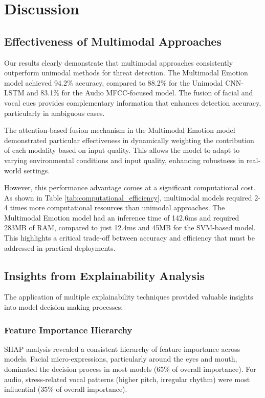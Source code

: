 \documentclass[conference,compsoc]{IEEEtran}
\begin{document}
\section{Discussion}
\nopagebreak[4]
\subsection{Effectiveness of Multimodal Approaches}
\nopagebreak[4]
Our results clearly demonstrate that multimodal approaches consistently outperform unimodal methods for threat detection. The Multimodal Emotion model achieved 94.2\% accuracy, compared to 88.2\% for the Unimodal CNN-LSTM and 83.1\% for the Audio MFCC-focused model. The fusion of facial and vocal cues provides complementary information that enhances detection accuracy, particularly in ambiguous cases.

The attention-based fusion mechanism in the Multimodal Emotion model demonstrated particular effectiveness in dynamically weighting the contribution of each modality based on input quality. This allows the model to adapt to varying environmental conditions and input quality, enhancing robustness in real-world settings.

However, this performance advantage comes at a significant computational cost. As shown in Table \ref{tab:computational_efficiency}, multimodal models required 2-4 times more computational resources than unimodal approaches. The Multimodal Emotion model had an inference time of 142.6ms and required 283MB of RAM, compared to just 12.4ms and 45MB for the SVM-based model. This highlights a critical trade-off between accuracy and efficiency that must be addressed in practical deployments.

\subsection{Insights from Explainability Analysis}
The application of multiple explainability techniques provided valuable insights into model decision-making processes:

\subsubsection{Feature Importance Hierarchy}
SHAP analysis revealed a consistent hierarchy of feature importance across models. Facial micro-expressions, particularly around the eyes and mouth, dominated the decision process in most models (65\% of overall importance). For audio, stress-related vocal patterns (higher pitch, irregular rhythm) were most influential (35\% of overall importance).
\end{document}
